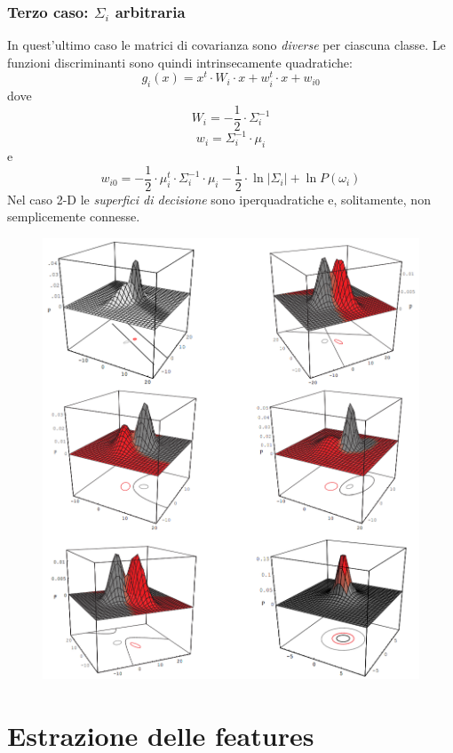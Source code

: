 \documentclass[a4paper,oneside,titlepage]{book}
\begin{document}
\subsection{Terzo caso: \texorpdfstring{$\Sigma_i$}{matrice di covarianza} arbitraria}
In quest'ultimo caso le matrici di covarianza sono \textit{diverse} per ciascuna classe. Le funzioni discriminanti sono quindi intrinsecamente quadratiche:
\[ g_i(x) = x^t \cdot W_i \cdot x + w_i^t \cdot x + w_{i0} \]
dove
\[ W_i = - \frac{1}{2} \cdot \Sigma_i^{-1} \]
\[ w_i = \Sigma_i^{-1}  \cdot \mu_i \]
e
\[ w_{i0} = - \frac{1}{2} \cdot \mu_i^t \cdot \Sigma_i^{-1} \cdot \mu_i - \frac{1}{2} \cdot \ln |\Sigma_i| + \ln P(\omega_i) \]
Nel caso 2-D le \textit{superfici di decisione} sono iperquadratiche e, solitamente, non semplicemente connesse.
\begin{figure}[htp]
	\centering
	\includegraphics[width=\textwidth, height=\textheight, keepaspectratio]{arbitrary.png}
\end{figure}


\chapter{Estrazione delle features}
\end{document}
